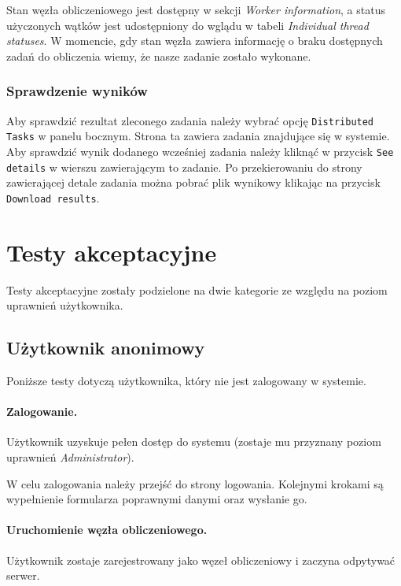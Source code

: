 \documentclass[a4paper,11pt,twoside]{report}
\theoremstyle{definition}
\begin{document}
        
        Stan węzła obliczeniowego jest dostępny w sekcji \textit{Worker information}, a status użyczonych wątków jest udostępniony do wglądu w tabeli \textit{Individual thread statuses}. W momencie, gdy stan węzła zawiera informację o braku dostępnych zadań do obliczenia wiemy, że nasze zadanie zostało wykonane.
        
        
        \subsubsection{Sprawdzenie wyników}
        
        Aby sprawdzić rezultat zleconego zadania należy wybrać opcję \texttt{Distributed Tasks} w panelu bocznym.
        Strona ta zawiera zadania znajdujące się w systemie.
        Aby sprawdzić wynik dodanego wcześniej zadania należy kliknąć w przycisk \texttt{See details} w wierszu zawierającym to zadanie.
        Po przekierowaniu do strony zawierającej detale zadania można pobrać plik wynikowy klikając na przycisk \texttt{Download results}.

    
    \section{Testy akceptacyjne}
        
        Testy akceptacyjne zostały podzielone na dwie kategorie ze względu na poziom uprawnień użytkownika.
        
        \subsection{Użytkownik anonimowy}
            Poniższe testy dotyczą użytkownika, który nie jest zalogowany w systemie.
        
        
            \paragraph{Zalogowanie.} 
                \noindent Użytkownik uzyskuje pełen dostęp do systemu (zostaje mu przyznany poziom uprawnień \textit{Administrator}). 
            
                W celu zalogowania należy przejść do strony logowania. Kolejnymi krokami są wypełnienie formularza poprawnymi danymi oraz wysłanie go.
                
            \paragraph{Uruchomienie węzła obliczeniowego.} 
                \noindent Użytkownik zostaje zarejestrowany jako węzeł obliczeniowy i zaczyna odpytywać serwer.
                
\end{document}
